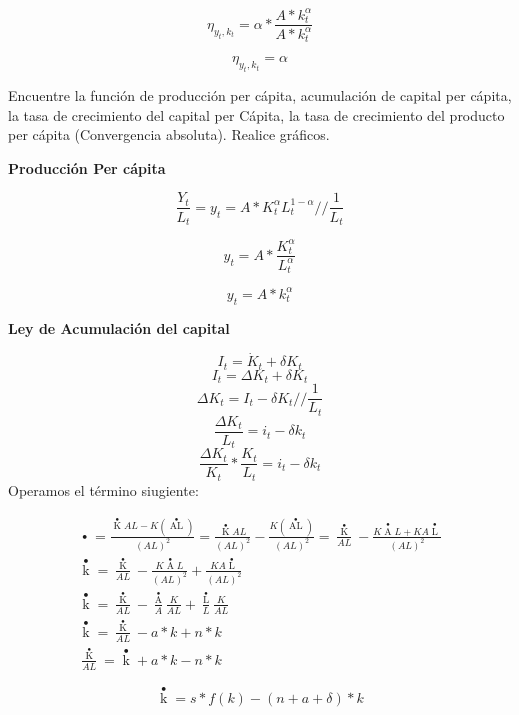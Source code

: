 \documentclass{oxmathproblems}
\begin{document}
\begin{questions}
\begin{parts}
\begin{subparts}
    $$\eta_{y_t,k_t} =  \alpha * \dfrac{A*k_t^{\alpha}}{A*k_t^{\alpha}}$$
    
    $$\eta_{y_t,k_t} =  \alpha$$
    
\subpart    
    Encuentre la función de producción per cápita, acumulación de capital per cápita, la tasa de crecimiento del capital per Cápita, la tasa de crecimiento del producto per cápita (Convergencia absoluta). Realice gráficos.
    
    \textbf{Producción Per cápita}
    
     $$\dfrac{Y_t}{L_t} = y_t = A*K_t^\alpha L_t^{1-\alpha} // \dfrac{1}{L_t}$$
    
    $$y_t = A*\dfrac{K_t^\alpha}{L_t^{\alpha}}$$
    
    $$y_t = A*k_t^\alpha$$
    
    \textbf{Ley de Acumulación del capital}
    
    \[{I_t} = {{\dot K}_t} + \delta {K_t}\] 
    $${I_t} = \Delta K_t + \delta {K_t}$$
    $$\Delta K_t = {I_t} - \delta {K_t} // \dfrac{1}{L_t}$$ 
    $$\dfrac{\Delta K_t}{L_t} = i_t - \delta {k_t}$$
    $$\dfrac{\Delta K_t}{K_t}*\dfrac{K_t}{L_t} = i_t - \delta {k_t}$$
    Operamos el término siugiente:
   
    \[\begin{array}{l}
\mathop {\left( {\frac{K}{{AL}}} \right)}\limits^ \bullet   = \frac{{\mathop K\limits^ \bullet  AL - K(\mathop {AL}\limits^ \bullet  )}}{{{{(AL)}^2}}} = \frac{{\mathop K\limits^ \bullet  AL}}{{{{(AL)}^2}}} - \frac{{K(\mathop {AL}\limits^ \bullet  )}}{{{{(AL)}^2}}} = \frac{{\mathop K\limits^ \bullet  }}{{AL}} - \frac{{K\mathop A\limits^ \bullet  L + KA\mathop L\limits^ \bullet  }}{{{{(AL)}^2}}}\\
\mathop k\limits^ \bullet   = \frac{{\mathop K\limits^ \bullet  }}{{AL}} - \frac{{K\mathop A\limits^ \bullet  L}}{{{{(AL)}^2}}} + \frac{{KA\mathop L\limits^ \bullet  }}{{{{(AL)}^2}}}\\
\mathop k\limits^ \bullet   = \frac{{\mathop K\limits^ \bullet  }}{{AL}} - \frac{{\mathop A\limits^ \bullet  }}{A}\frac{K}{{AL}} + \frac{{\mathop L\limits^ \bullet  }}{L}\frac{K}{{AL}}\\
\mathop k\limits^ \bullet   = \frac{{\mathop K\limits^ \bullet  }}{{AL}} - a*k + n*k\\
\frac{{\mathop K\limits^ \bullet  }}{{AL}} = \mathop k\limits^ \bullet   + a*k - n*k
\end{array}\]
     
     $$\mathop k\limits^ \bullet   = s*f(k) - (n + a + \delta )*k$$
        

\end{subparts}
\end{parts}
\end{questions}
\end{document}

